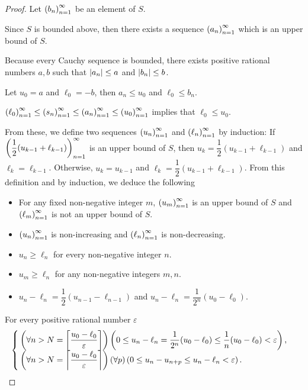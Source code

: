 \begin{proof}
    Let ${\left({b_{n}}\right)}^{\infty}_{n=1}$ be an element of $S$.

    Since $S$ is bounded above, then there exists a sequence ${\left({a_{n}}\right)}^{\infty}_{n=1}$ which is an upper bound of $S$.

    Because every Cauchy sequence is bounded, there exists positive rational numbers $a, b$ such that $\left\vert{a_{n}}\right\vert\le a$ and $\left\vert{b_{n}}\right\vert\le b$.

    Let $u_{0} = a$ and $\ell_{0} = -b$, then $a_{n} \le u_{0}$ and $\ell_{0} \le b_{n}$.

    ${\left({\ell_{0}}\right)}^{\infty}_{n=1} \le {\left({s_{n}}\right)}^{\infty}_{n=1} \le {\left({a_{n}}\right)}^{\infty}_{n=1} \le {\left({u_{0}}\right)}^{\infty}_{n=1}$ implies that $\ell_{0} \le u_{0}$.

    From these, we define two sequences ${\left({u_{n}}\right)}^{\infty}_{n=1}$ and ${\left({\ell_{n}}\right)}^{\infty}_{n=1}$ by induction: If ${\left({\dfrac{1}{2}(u_{k-1} + \ell_{k-1})}\right)}^{\infty}_{n=1}$ is an upper bound of $S$, then $u_{k} = \dfrac{1}{2}(u_{k-1} + \ell_{k-1})$ and $\ell_{k} = \ell_{k-1}$. Otherwise, $u_{k} = u_{k-1}$ and $\ell_{k} = \dfrac{1}{2}(u_{k-1} + \ell_{k-1})$. From this definition and by induction, we deduce the following
    \begin{itemize}[itemsep=0pt]
        \item For any fixed non-negative integer $m$, ${\left({u_{m}}\right)}^{\infty}_{n=1}$ is an upper bound of $S$ and ${\left({\ell_{m}}\right)}^{\infty}_{n=1}$ is not an upper bound of $S$.
        \item ${\left({u_{n}}\right)}^{\infty}_{n=1}$ is non-increasing and ${\left({\ell_{n}}\right)}^{\infty}_{n=1}$ is non-decreasing.
        \item $u_{n} \ge \ell_{n}$ for every non-negative integer $n$.
        \item $u_{m} \ge \ell_{n}$ for any non-negative integers $m, n$.
        \item $u_{n} - \ell_{n} = \dfrac{1}{2}(u_{n-1} - \ell_{n-1})$ and $u_{n} - \ell_{n} = \dfrac{1}{2^{n}}(u_{0} - \ell_{0})$.
    \end{itemize}

    For every positive rational number $\varepsilon$
    \[
        \begin{cases}
            \left(\forall n > N = \left\lceil{\dfrac{u_{0} - \ell_{0}}{\varepsilon}}\right\rceil\right)\left( 0 \le u_{n} - \ell_{n} = \dfrac{1}{2^{n}}(u_{0} - \ell_{0}) \le \dfrac{1}{n}(u_{0} - \ell_{0}) < \varepsilon \right), \\
            \left(\forall n > N = \left\lceil{\dfrac{u_{0} - \ell_{0}}{\varepsilon}}\right\rceil\right)(\forall p)\left( 0 \le u_{n} - u_{n+p} \le u_{n} - \ell_{n} < \varepsilon \right).
        \end{cases}
    \]


\end{proof}
